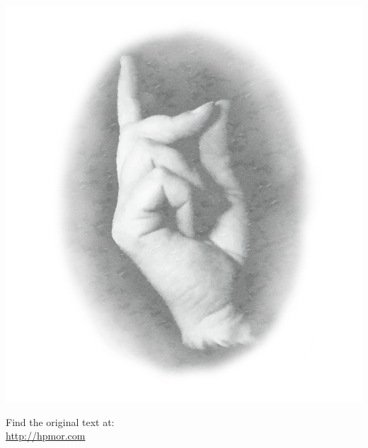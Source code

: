 \cleartorecto

\begin{center}
\thispagestyle{empty}

\Huge{}\vspace*{0.5cm}

\large{}

\Large{} \vspace*{.5cm}
 
\includegraphics[scale=0.5]{bubble0.png} 

\vspace*{.5cm}
\huge{}
\normalsize


\vspace{2cm}
Find the original text at:\\
\url{http://hpmor.com} \\

\end{center}
